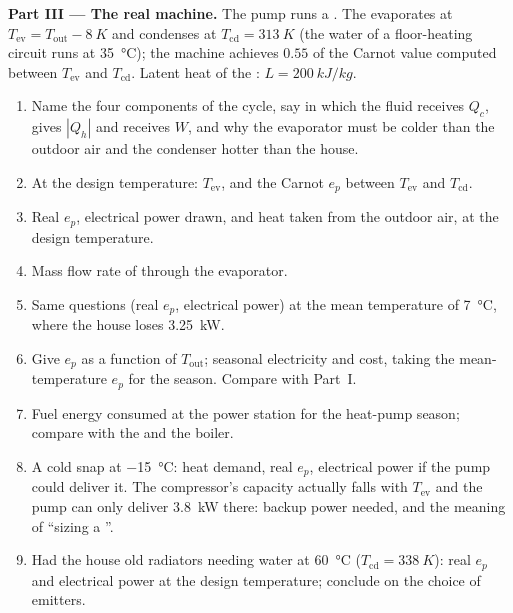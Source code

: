 \begin{problem}
\medskip
\noindent\textbf{Part III --- The real machine.}
The pump runs a . The  evaporates at
$T_{\mathrm{ev}} = T_{\mathrm{out}} - \qty{8}{K}$ and condenses at
$T_{\mathrm{cd}} = \qty{313}{K}$ (the water of a floor-heating circuit runs at
\qty{35}{\degreeCelsius}); the machine achieves $0.55$ of the Carnot
value computed between $T_{\mathrm{ev}}$ and $T_{\mathrm{cd}}$. Latent heat of
the : $L = \qty{200}{kJ/kg}$.
\begin{enumerate}[resume]
  \item Name the four components of the cycle, say in which the fluid
        receives $Q_c$, gives $|Q_h|$ and receives $W$, and why the
        evaporator must be colder than the outdoor air and the
        condenser hotter than the house.
  \item At the design temperature: $T_{\mathrm{ev}}$, and the Carnot $e_p$
        between $T_{\mathrm{ev}}$ and $T_{\mathrm{cd}}$.
  \item Real $e_p$, electrical power drawn, and heat taken from the
        outdoor air, at the design temperature.
  \item Mass flow rate of  through the evaporator.
  \item Same questions (real $e_p$, electrical power) at the mean
        temperature of \qty{7}{\degreeCelsius}, where the house loses
        \qty{3.25}{kW}.
  \item Give $e_p$ as a function of $T_{\mathrm{out}}$; seasonal electricity
        and cost, taking the mean-temperature $e_p$ for the season.
        Compare with Part~I.
  \item Fuel energy consumed at the power station for the heat-pump
        season; compare with the  and the boiler.
  \item A cold snap at \qty{-15}{\degreeCelsius}: heat demand, real $e_p$,
        electrical power if the pump could deliver it. The compressor's
        capacity actually falls with $T_{\mathrm{ev}}$ and the pump can only
        deliver \qty{3.8}{kW} there: backup  power needed, and
        the meaning of ``sizing a ''.
  \item Had the house old radiators needing water at
        \qty{60}{\degreeCelsius} ($T_{\mathrm{cd}} = \qty{338}{K}$): real $e_p$
        and electrical power at the design temperature; conclude on the
        choice of emitters.
\end{enumerate}


\end{problem}
